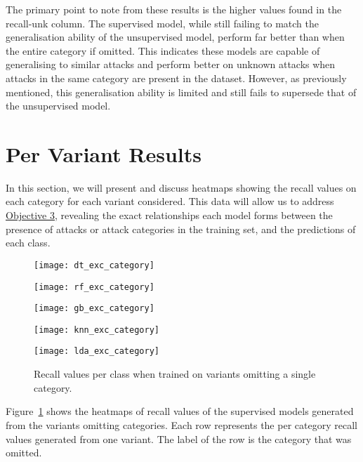 The primary point to note from these results is the higher values found in the
recall-unk column. The supervised model, while still failing to match the
generalisation ability of the unsupervised model, perform far better than when
the entire category if omitted. This indicates these models are capable of
generalising to similar attacks and perform better on unknown attacks when
attacks in the same category are present in the dataset. However, as previously
mentioned, this generalisation ability is limited and still fails to supersede
that of the unsupervised model.

\section{Per Variant Results}%
\label{sec:res_var}

In this section, we will present and discuss heatmaps showing the recall values
on each category for each variant considered. This data will allow us to
address \hyperlink{obj}{Objective 3}, revealing the exact relationships each
model forms between the presence of attacks or attack categories in the
training set, and the predictions of each class.

%
\begin{figure}[htbp]
    \centering
    \begin{minipage}[h]{0.5\textwidth}
        \centering
        \texttt{[image: dt\_exc\_category]}
    \end{minipage}\hfill
    \begin{minipage}[h]{0.5\textwidth}
        \centering
        \texttt{[image: rf\_exc\_category]}
    \end{minipage}
    \begin{minipage}[h]{0.5\textwidth}
        \centering
        \texttt{[image: gb\_exc\_category]}
    \end{minipage}\hfill
    \begin{minipage}[h]{0.5\textwidth}
        \centering
        \texttt{[image: knn\_exc\_category]}
    \end{minipage}
    \begin{minipage}[h]{0.5\textwidth}
        \centering
        \texttt{[image: lda\_exc\_category]}
    \end{minipage}
    \caption[Category Omission Results]{Recall values per class when trained on variants omitting a single category.\label{fig:exc_cat}}
\end{figure}
% 
Figure~\ref{fig:exc_cat} shows the heatmaps of recall values of the supervised
models generated from the variants omitting categories. Each row represents the
per category recall values generated from one variant. The label of the row is
the category that was omitted.


